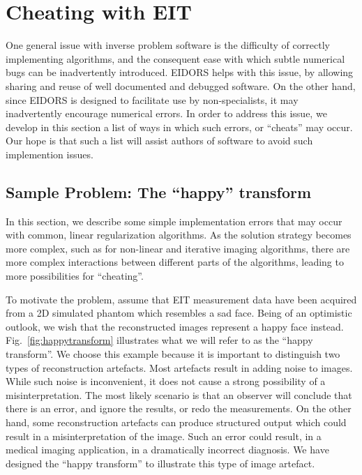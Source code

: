 \documentclass[12pt]{iopart}
\begin{document}
\section{
 Cheating with EIT
}

One general issue with inverse problem software is the difficulty
of correctly implementing algorithms, and the consequent ease with
which subtle numerical bugs can be inadvertently introduced.
EIDORS helps with this issue, by allowing sharing and reuse
of well documented and debugged software. On the other hand, 
since EIDORS is designed to facilitate use by non-specialists,
it may inadvertently encourage numerical errors.
In order to address this issue, we develop in this section
a list of ways in which such errors, or ``cheats'' may occur.
Our hope is that such a list will assist authors of software
to avoid such implemention issues.

\subsection{
Sample Problem: The ``happy'' transform
}

In this section, we describe some simple implementation
errors that may occur with common, linear
regularization algorithms. As the solution
strategy becomes more complex, such as for non-linear 
and iterative imaging algorithms, there are
more complex interactions between different 
parts of the algorithms, leading to more possibilities
for ``cheating''.

To motivate the problem, assume that EIT measurement
data have been acquired from a 2D simulated phantom which resembles
a sad face. Being of an optimistic outlook, we wish
that the reconstructed images represent a happy face
instead. Fig.~\ref{fig:happytransform}
illustrates what we will refer to as the ``happy transform''.
We choose this example because it is important to distinguish
two types of reconstruction artefacts. Most artefacts result
in adding noise to images. While such noise is inconvenient, it does
not cause a strong possibility of a misinterpretation.
The most likely scenario is that an observer will conclude
that there is an error, and ignore the results, or redo the measurements.
On the other hand, some reconstruction artefacts can
produce structured output which could result in a 
misinterpretation of the image. Such an error could result, in a
medical imaging application, in a dramatically
incorrect diagnosis. We have designed the ``happy transform''
to illustrate this type of image artefact.
\end{document}
